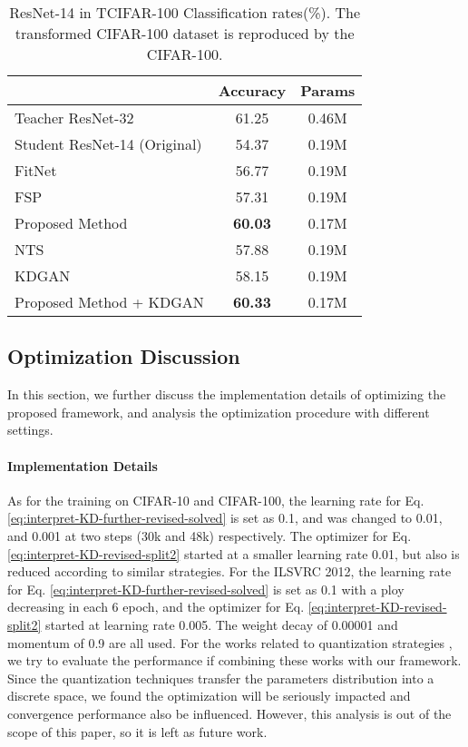 \documentclass[10pt,twocolumn,letterpaper]{article}
\begin{document}
\begin{table}[ht]
\begin{center}
\begin{tabular}{l|c|c}
\hline
 & Accuracy & Params\\
\hline
Teacher ResNet-32 & 61.25 &  0.46M\\
Student ResNet-14 (Original) & 54.37 &  0.19M\\
FitNet \cite{Romero2014FitNets} & 56.77 &  0.19M\\
FSP \cite{yim2017gift} & 57.31 &  0.19M\\
Proposed Method & \textbf{60.03} &  0.17M\\
NTS \cite{huang2017like} & 57.88 &  0.19M\\
KDGAN \cite{wang2018kdgan} & 58.15 &  0.19M\\
Proposed Method + KDGAN \cite{wang2018kdgan}  & \textbf{60.33} &  0.17M\\
\hline
\end{tabular}
\end{center}
\caption{ResNet-14 in TCIFAR-100 Classification rates(\%). The transformed CIFAR-100 dataset is reproduced by the CIFAR-100.}
\label{tab:tcifar100}
\end{table}

\subsection{Optimization Discussion}\label{sec_optimization_analysis}
In this section,
we further discuss the implementation details of optimizing the proposed framework,
and analysis the optimization procedure with different settings.

\paragraph{Implementation Details}
As for the training on CIFAR-10 and CIFAR-100,
the learning rate for Eq. \ref{eq:interpret-KD-further-revised-solved} is set as 0.1,
and was changed to 0.01, and 0.001 at two steps (30k and 48k) respectively.
The optimizer for Eq. \ref{eq:interpret-KD-revised-split2}
started at a smaller learning rate 0.01,
but also is reduced according to similar strategies.
For the ILSVRC 2012,
the learning rate for Eq. \ref{eq:interpret-KD-further-revised-solved} is set as 0.1
with a ploy decreasing in each 6 epoch,
and the optimizer for Eq. \ref{eq:interpret-KD-revised-split2}
started at learning rate 0.005.
The weight decay of 0.00001 and momentum of 0.9 are all used.
For the works related to quantization strategies \cite{jacob2018quantization, rastegari2016xnor},
we try to evaluate the performance if combining these works with our framework.
Since the quantization techniques transfer the parameters distribution into a discrete space,
we found the optimization will be seriously impacted
and convergence performance also be influenced.
However,
this analysis is out of the scope of this paper,
so it is left as future work.
\end{document}
